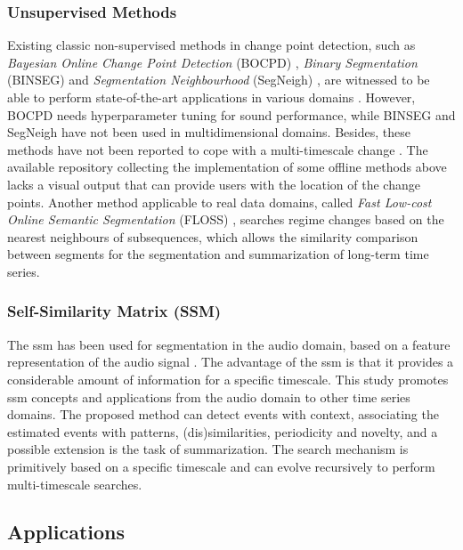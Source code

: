 \subsubsection{Unsupervised Methods}

Existing classic non-supervised methods in change point detection,  such as \textit{Bayesian Online Change Point Detection} (BOCPD) \cite{bocpd}, \textit{Binary Segmentation} (BINSEG) \cite{binseg} and \textit{Segmentation Neighbourhood} (SegNeigh) \cite{segneigh}, are witnessed to be able to perform state-of-the-art applications in various domains \cite{cpd_alan}. However, BOCPD needs hyperparameter tuning for sound performance, while BINSEG and SegNeigh have not been used in multidimensional domains. Besides, these methods have not been reported to cope with a multi-timescale change \cite{cpd_alan}. The available repository \cite{cpd_alan} collecting the implementation of some offline methods \cite{review_2} above lacks a visual output that can provide users with the location of the change points. Another method applicable to real data domains, called \textit{Fast Low-cost Online Semantic Segmentation} (FLOSS) \cite{floss, eamonn_segmentation}, searches regime changes based on the nearest neighbours of subsequences, which allows the similarity comparison between segments for the segmentation and summarization of long-term time series.

\subsubsection{Self-Similarity Matrix (SSM)}

The \gls{ssm} has been used for segmentation in the audio domain, based on a feature representation of the audio signal \cite{MuellerZ19_FMP_ISMIR}. The advantage of the \gls{ssm} is that it provides a considerable amount of information for a specific timescale. This study promotes \gls{ssm} concepts and applications from the audio domain to other time series domains. The proposed method can detect events with context, associating the estimated events with patterns, (dis)similarities, periodicity and novelty, and a possible extension is the task of summarization. The search mechanism is primitively based on a specific timescale and can evolve recursively to perform multi-timescale searches.

\subsection{Applications}

